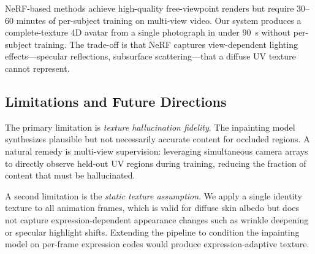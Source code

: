\documentclass[conference]{IEEEtran}
\begin{document}
\begin{table}[h]
  \caption{Comparison of 4D face representations.}
  \label{tab:comparison}
  \centering
\end{table}

NeRF-based methods achieve high-quality free-viewpoint renders but require
30--60 minutes of per-subject training on multi-view video. Our system produces
a complete-texture 4D avatar from a single photograph in under 90~s without
per-subject training. The trade-off is that NeRF captures view-dependent
lighting effects---specular reflections, subsurface scattering---that a diffuse
UV texture cannot represent.

\subsection{Limitations and Future Directions}

The primary limitation is \emph{texture hallucination fidelity}. The inpainting
model synthesizes plausible but not necessarily accurate content for occluded
regions. A natural remedy is multi-view supervision: leveraging simultaneous
camera arrays to directly observe held-out UV regions during training, reducing
the fraction of content that must be hallucinated.

A second limitation is the \emph{static texture assumption}. We apply a single
identity texture to all animation frames, which is valid for diffuse skin albedo
but does not capture expression-dependent appearance changes such as wrinkle
deepening or specular highlight shifts. Extending the pipeline to condition the
inpainting model on per-frame expression codes would produce
expression-adaptive texture.
\end{document}
